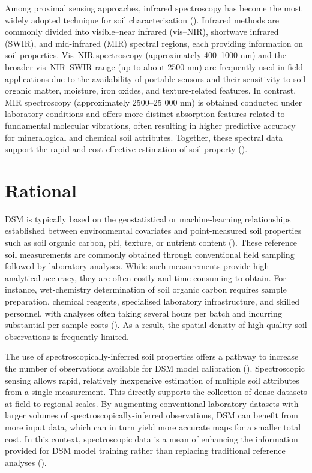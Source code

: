 \documentclass[
  10pt,
  b5paper,
  oneside]{book}
\begin{document}
Among proximal sensing approaches, infrared spectroscopy has become the most widely adopted technique for soil characterisation (). Infrared methods are commonly divided into visible--near infrared (vis--NIR), shortwave infrared (SWIR), and mid-infrared (MIR) spectral regions, each providing information on soil properties. Vis--NIR spectroscopy (approximately 400--1000 nm) and the broader vis--NIR--SWIR range (up to about 2500 nm) are frequently used in field applications due to the availability of portable sensors and their sensitivity to soil organic matter, moisture, iron oxides, and texture-related features. In contrast, MIR spectroscopy (approximately 2500--25 000 nm) is obtained conducted under laboratory conditions and offers more distinct absorption features related to fundamental molecular vibrations, often resulting in higher predictive accuracy for mineralogical and chemical soil attributes. Together, these spectral data support the rapid and cost-effective estimation of soil property ().

\section{Rational}\label{rational}

DSM is typically based on the geostatistical or machine-learning relationships established between environmental covariates and point-measured soil properties such as soil organic carbon, pH, texture, or nutrient content (). These reference soil measurements are commonly obtained through conventional field sampling followed by laboratory analyses. While such measurements provide high analytical accuracy, they are often costly and time-consuming to obtain. For instance, wet-chemistry determination of soil organic carbon requires sample preparation, chemical reagents, specialised laboratory infrastructure, and skilled personnel, with analyses often taking several hours per batch and incurring substantial per-sample costs (). As a result, the spatial density of high-quality soil observations is frequently limited.

The use of spectroscopically-inferred soil properties offers a pathway to increase the number of observations available for DSM model calibration (). Spectroscopic sensing allows rapid, relatively inexpensive estimation of multiple soil attributes from a single measurement. This directly supports the collection of dense datasets at field to regional scales. By augmenting conventional laboratory datasets with larger volumes of spectroscopically-inferred observations, DSM can benefit from more input data, which can in turn yield more accurate maps for a smaller total cost. In this context, spectroscopic data is a mean of enhancing the information provided for DSM model training rather than replacing traditional reference analyses ().
\end{document}
